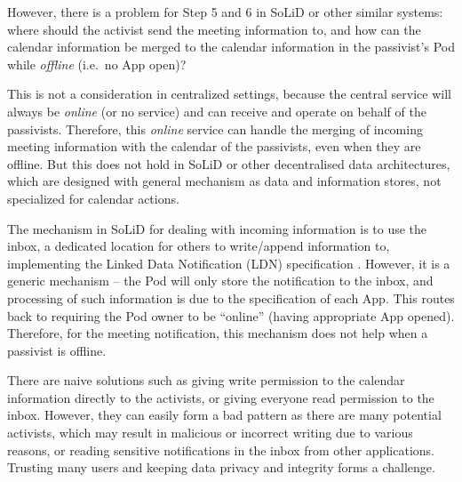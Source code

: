 \documentclass[
twocolumn,
]{ceurart}
\begin{document}

However, there is a problem for Step 5 and 6 in SoLiD or other similar systems: where should the activist send the meeting information to, and how can the calendar information be merged to the calendar information in the passivist's Pod while \emph{offline} (i.e.~no App open)?

This is not a consideration in centralized settings, because the central service will always be \emph{online} (or no service) and can receive and operate on behalf of the passivists. Therefore, this \emph{online} service can handle the merging of incoming meeting information with the calendar of the passivists, even when they are offline. But this does not hold in SoLiD or other decentralised data architectures, which are designed with general mechanism as data and information stores, not specialized for calendar actions.

The mechanism in SoLiD for dealing with incoming information is to use the inbox, a dedicated location for others to write/append information to, implementing the Linked Data Notification (LDN) specification \cite{w3c_linked_2017}. However, it is a generic mechanism -- the Pod will only store the notification to the inbox, and processing of such information is due to the specification of each App. This routes back to requiring the Pod owner to be ``online'' (having appropriate App opened). Therefore, for the meeting notification, this mechanism does not help when a passivist is offline.

There are naive solutions such as giving write permission to the calendar information directly to the activists, or giving everyone read permission to the inbox. However, they can easily form a bad pattern as there are many potential activists, which may result in malicious or incorrect writing due to various reasons, or reading sensitive notifications in the inbox from other applications. Trusting many users and keeping data privacy and integrity forms a challenge.

\end{document}
